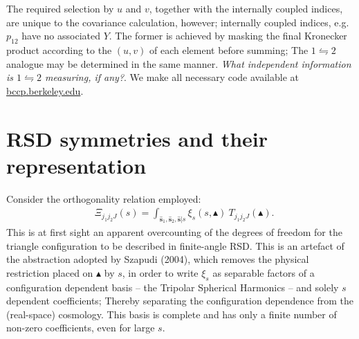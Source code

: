 \documentclass[useAMS,usenatbib]{mn2e}
\begin{document}
The required selection by $u$ and $v$, together with the internally coupled indices, are unique to the covariance calculation, however; internally coupled indices, e.g. $p_{12}$ have no associated $Y$.  The former is achieved by masking the final Kronecker product according to the $(u,v)$ of each element before summing;  The $1 \leftrightharpoons2$ analogue may be determined in the same manner. \emph{What independent information is $1 \leftrightharpoons2$ measuring, if any?}.    
We make all necessary code available at \url{bccp.berkeley.edu}.



\appendix
\section{RSD symmetries and their representation}
Consider the orthogonality relation employed:
\begin{align}
& \Xi_{j_1 j_2 J}(s) = \int_{\boldsymbol {\hat s}_1, \boldsymbol {\hat s}_2, \boldsymbol {\hat s} | s} \xi_s(s, \blacktriangle) \ T_{j_1 j_2 J}(\blacktriangle). 
\end{align}
This is at first sight an apparent overcounting of the degrees of freedom for the triangle configuration to be described in finite-angle RSD.  This is an artefact of the abstraction adopted by Szapudi (2004), which removes the physical restriction placed on $\blacktriangle$ by $s$, in order to write $\xi_s$ as separable factors of a configuration dependent basis -- the Tripolar Spherical Harmonics -- and solely $s$ dependent coefficients;  Thereby separating the configuration dependence from the (real-space) cosmology.  This basis is complete and has only a finite number of non-zero coefficients, even for large $s$.  
\end{document}
